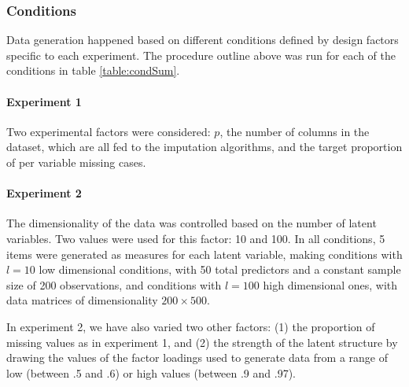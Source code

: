 \subsubsection{Conditions}
	
	Data generation happened based on different conditions defined by design factors specific to each experiment.
	The procedure outline above was run for each of the conditions in table \ref{table:condSum}.

	\paragraph{Experiment 1}
	Two experimental factors were considered: $p$, the number of columns in the dataset, which 
	are all fed to the imputation algorithms, and the target proportion of per variable missing cases. 

	\paragraph{Experiment 2}
	The dimensionality of the data was controlled based on the number of latent variables. 
	Two values were used for this factor: 10 and 100. 
	In all conditions, 5 items were generated as measures for each latent variable, making conditions with $l = 10$ 
	low dimensional conditions, with 50 total predictors and a constant sample size of 200 observations, and 
	conditions with $l = 100$ high dimensional ones, with data matrices of dimensionality $200 \times 500$.

	In experiment 2, we have also varied two other factors: (1) the proportion of missing values as in experiment 1, 
	and (2) the strength of the latent structure by drawing the values of the factor loadings used to generate data
	from a range of low (between .5 and .6) or high values (between .9 and .97).

